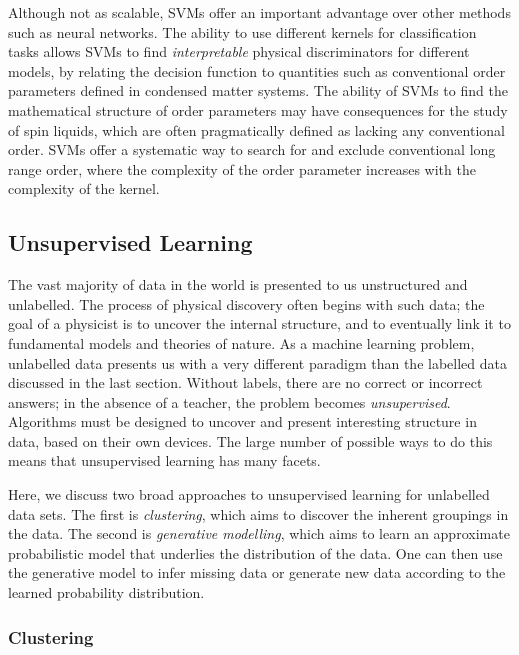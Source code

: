 \documentclass[aps,prb,floatfix,amsmath,amssymb,amsfonts,10pt,floatfix,longbibliography]{revtex4-1}
\begin{document}
Although not as scalable, SVMs offer an important advantage over other methods such as neural networks. The ability to use different kernels for classification tasks allows SVMs to find {\it interpretable} physical discriminators for different models, 
by relating the decision function to quantities such as conventional order parameters defined in condensed matter systems.
The ability of SVMs to find the mathematical structure of order parameters may have consequences for the study of spin liquids, which are often pragmatically defined as lacking any conventional order.  SVMs offer a systematic way to search for and exclude conventional long range order, where the complexity of the order parameter increases with the complexity of the kernel.


\subsection{Unsupervised Learning}

The vast majority of data in the world is presented to us unstructured and unlabelled.  The process of physical discovery often begins with such data; the goal of a physicist is to uncover the internal structure, and to eventually link it to fundamental models and theories of nature.  As a machine learning problem, unlabelled data presents us with a very different paradigm than the labelled data discussed in the last section.  Without labels, there are no correct or incorrect answers; in the absence of a teacher, the problem becomes {\it unsupervised}.  Algorithms must be designed to uncover and present interesting structure in data, based on their own devices.  The large number of possible ways to do this means that unsupervised learning has many facets.  

Here, we discuss two broad approaches to unsupervised learning for unlabelled data sets. The first is {\it clustering}, which aims to discover the inherent groupings in the data.  The second is {\it generative modelling}, which aims to learn an approximate probabilistic model that underlies the distribution of the data. One can then use the generative model to infer missing data or generate new data according to the learned probability distribution. 

\subsubsection{Clustering}
\end{document}
